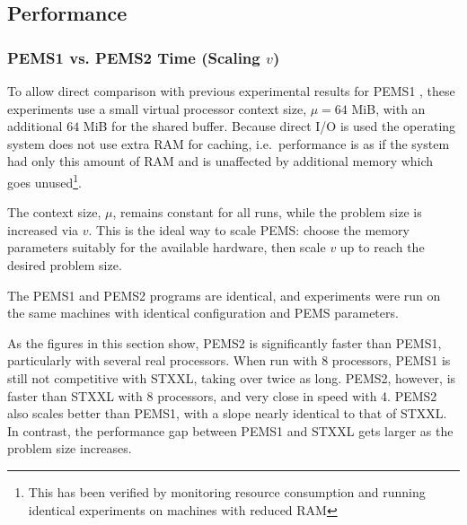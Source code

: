 \documentclass[12pt]{carletoncsthesis}
\begin{document}
\subsection{Performance}
\label{psrs-results}


\subsubsection{PEMS1 vs. PEMS2 Time (Scaling $v$)}
\label{vs_small}


To allow direct comparison with previous experimental results for
PEMS1 \cite{mnthesis}, these experiments use a small virtual processor context
size, $\mu = 64$ MiB, with an additional $64$ MiB for the shared buffer.
Because direct I/O is used the operating system does not use extra RAM
for caching, i.e.\ performance is as if the system had only this amount of
RAM and is unaffected by additional memory which goes unused\footnote{This
has been verified by monitoring resource consumption and running identical
experiments on machines with reduced RAM}.

The context size, $\mu$, remains constant for all runs, while the problem
size is increased via $v$.  This is the ideal way to scale PEMS: choose
the memory parameters suitably for the available hardware, then scale $v$
up to reach the desired problem size.

The PEMS1 and PEMS2 programs are identical, and experiments were run on the
same machines with identical configuration and PEMS parameters.

As the figures in this section show, PEMS2 is significantly faster than
PEMS1, particularly with several real processors.  When run with 8 processors,
PEMS1 is still not competitive with STXXL, taking over twice as long.  PEMS2,
however, is faster than STXXL with 8 processors, and very close in speed
with 4.  PEMS2 also scales better than PEMS1, with a slope nearly identical
to that of STXXL.  In contrast, the performance gap between PEMS1 and STXXL
gets larger as the problem size increases.
\end{document}
